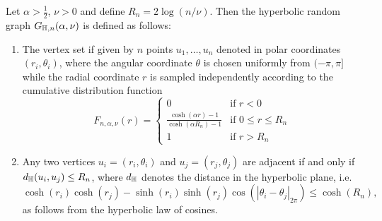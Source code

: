Let $\alpha > \frac{1}{2}$, $\nu > 0$ and define $R_n = 2\log(n/\nu)$. Then the hyperbolic random graph $G_{\mathbb{H},n}(\alpha, \nu)$ is defined as follows:
\begin{enumerate}
\item The vertex set if given by $n$ points $u_1, \dots, u_n$ denoted in polar coordinates $(r_i, \theta_i)$, where the angular coordinate $\theta$ is chosen uniformly from $(-\pi,\pi]$ while the radial coordinate $r$ is sampled independently according to the cumulative distribution function
\begin{equation}\label{eq:def_hyperbolic_point_distribution}
	F_{n,\alpha,\nu}(r) = \begin{cases}
		0 &\mbox{if } r < 0\\
		\frac{\cosh(\alpha r)-1}{\cosh(\alpha R_n) - 1} &\mbox{if } 0 \le r \le R_n\\
		1&\mbox{if } r > R_n
	\end{cases}
\end{equation}
\item Any two vertices $u_i=(r_i,\theta_i)$ and $u_j=(r_j,\theta_j)$ are adjacent if and only if $d_{\mathbb{H}}(u_i,u_j) \le R_n$, where $d_{\mathbb{H}}$ denotes the distance in the hyperbolic plane, i.e.
\[
	\cosh(r_i) \cosh(r_j) - \sinh(r_i) \sinh( r_j) \cos(|\theta_i-\theta_j|_{2\pi}) \le \cosh(R_n),
\]
as follows from the hyperbolic law of cosines.%
\end{enumerate}

